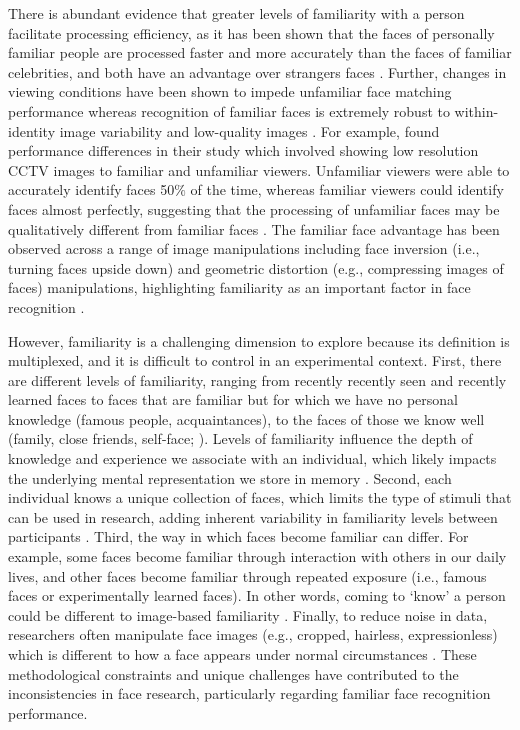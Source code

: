 \documentclass[
  authoryear,
  review,
  3p,
  onecolumn]{elsarticle}
\begin{document}
There is abundant evidence that greater levels of familiarity with a
person facilitate processing efficiency, as it has been shown that the
faces of personally familiar people are processed faster and more
accurately than the faces of familiar celebrities, and both have an
advantage over strangers faces
\citep{bortolon2017a, burton2015a, tong1999a, young2017a}. Further,
changes in viewing conditions have been shown to impede unfamiliar face
matching performance whereas recognition of familiar faces is extremely
robust to within-identity image variability and low-quality images
\citep{burton2013a, jenkins2011a, liccione2014a}. For example,
\citet{burton1999a} found performance differences in their study which
involved showing low resolution CCTV images to familiar and unfamiliar
viewers. Unfamiliar viewers were able to accurately identify faces
50\(\%\) of the time, whereas familiar viewers could identify faces
almost perfectly, suggesting that the processing of unfamiliar faces may
be qualitatively different from familiar faces \citep{burton1999a}. The
familiar face advantage has been observed across a range of image
manipulations including face inversion (i.e., turning faces upside down)
and geometric distortion (e.g., compressing images of faces)
manipulations, highlighting familiarity as an important factor in face
recognition
\citep{allen-davidian2021a, kramer2018a, yang2014a, rossion_picture-plane_2008, hole_effects_2002}.

However, familiarity is a challenging dimension to explore because its
definition is multiplexed, and it is difficult to control in an
experimental context. First, there are different levels of familiarity,
ranging from recently recently seen and recently learned faces to faces
that are familiar but for which we have no personal knowledge (famous
people, acquaintances), to the faces of those we know well (family,
close friends, self-face; \citet{ramon2011a}). Levels of familiarity
influence the depth of knowledge and experience we associate with an
individual, which likely impacts the underlying mental representation we
store in memory \citep{ramon2017a}. Second, each individual knows a
unique collection of faces, which limits the type of stimuli that can be
used in research, adding inherent variability in familiarity levels
between participants \citep{ramon2017a}. Third, the way in which faces
become familiar can differ. For example, some faces become familiar
through interaction with others in our daily lives, and other faces
become familiar through repeated exposure (i.e., famous faces or
experimentally learned faces). In other words, coming to `know' a person
could be different to image-based familiarity \citep{kramer2018a}.
Finally, to reduce noise in data, researchers often manipulate face
images (e.g., cropped, hairless, expressionless) which is different to
how a face appears under normal circumstances
\citep{burton2011a, long_database_2023}. These methodological
constraints and unique challenges have contributed to the
inconsistencies in face research, particularly regarding familiar face
recognition performance.
\end{document}
